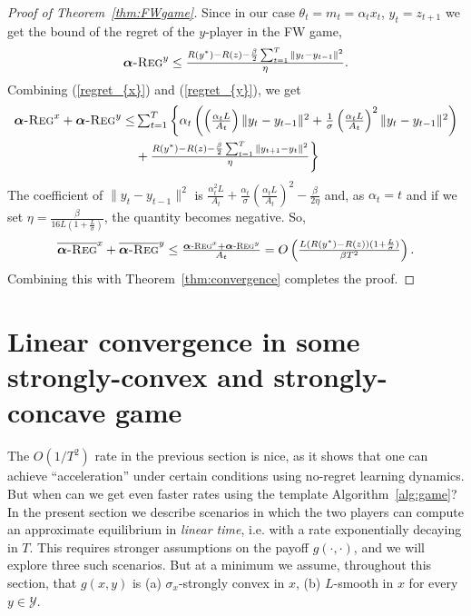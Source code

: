 \documentclass[pmlr]{jmlr} %
\def\balpha{\boldsymbol{\alpha}}
\newcommand{\regret}[1]{\balpha\textsc{-Reg}^{#1}}
\newcommand{\avgregret}[1]{\overline{\balpha\textsc{-Reg}}^{#1}}
\newcommand{\YY}{\mathcal{Y}}
\newcommand{\pr}[1]{\left(#1\right)}
\begin{document}
\begin{proof}[Proof of Theorem~\ref{thm:FWgame}]
	Since in our case $\theta_{t} = m_{t} = \alpha_{t} x_{t}$, $y_{t}=z_{{t+1}}$
	we get the bound of the regret of the $y$-player in the FW game,
	\begin{equation} \label{regret_{y}}
\textstyle	\regret{y} \leq \frac{  R(y^{*}) - R(z) - \frac{\beta}{2} \sum_{{t=1}}^{T} \| y_{t} - y_{t-1} \|^{2}}{\eta}.
	\end{equation}
	Combining (\ref{regret_{x}}) and (\ref{regret_{y}}),
	we get 
	\begin{equation} \label{regretxy}
	\begin{aligned}
\textstyle	\regret{x} + \regret{y} 
\textstyle	\leq & \textstyle \sum_{t=1}^{T} \textstyle \bigg\{
	\alpha_{t}  \pr{\pr{\frac{\alpha_{t} L}{A_{t}}} \| y_{t} - y_{t-1} \|^{2} + \frac{1}{\sigma} \pr{\frac{\alpha_{t} L }{A_{t}}}^{2}  \| y_{t} - y_{t-1} \|^{2} } \\ & \textstyle + \frac{ R(y^{*}) - R(z) - \frac{\beta}{2} \sum_{{t=1}}^{T} \| y_{t+1} - y_{t} \|^{2}}{\eta} \bigg\}
	\end{aligned}
	\end{equation}
	The coefficient of $\| y_{t} - y_{t-1} \|^{2}$ is $\frac{\alpha_{t}^{2} L}{A_{t}} +  \frac{\alpha_{t}}{\sigma} (\frac{\alpha_{t} L }{A_{t}})^{2} - \frac{\beta}{2 \eta }$ and, as $\alpha_{t}=t$ and if we set $\eta =\frac{\beta }{ 16L ( 1 + \frac{L}{\sigma})}$, the quantity becomes negative.
	So,
	\begin{equation} \label{theRate}
\textstyle	\avgregret{x} + \avgregret{y}
	\leq  \frac{
		\regret{x} + \regret{y} }{  A_{t}}
	= O\pr{ \frac{ L ( R(y^{*}) -R(z) )(1+\frac{L}{\sigma}) }{ \beta T^{2}}}.
	\end{equation}
	Combining this with Theorem~\ref{thm:convergence} completes the proof. \end{proof}
 

\section{Linear convergence in some strongly-convex and strongly-concave game}


The $O(1/T^{2})$ rate in the previous section is nice, as it shows that one can achieve ``acceleration'' under certain conditions using no-regret learning dynamics. But when can we get even faster rates using the template Algorithm~\ref{alg:game}? In the present section we describe scenarios in which the two players can compute an approximate equilibrium in \emph{linear time}, i.e. with a rate exponentially decaying in $T$. This requires stronger assumptions on the payoff $g(\cdot,\cdot)$, and we will explore three such scenarios. But at a minimum we assume, throughout this section, that $g(x,y)$ is (a) $\sigma_{x}$-strongly convex in $x$, (b) $L$-smooth in $x$ for every $y \in \YY$.
\end{document}
